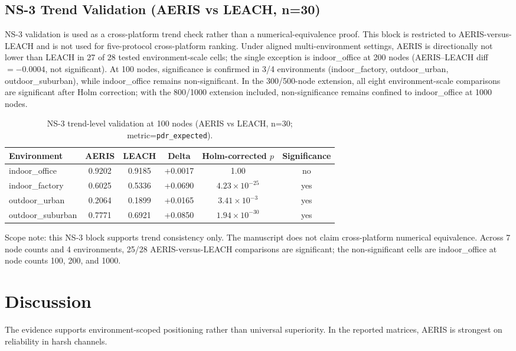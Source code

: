 \documentclass[sensors,article,submit,moreauthors,pdftex]{Definitions/mdpi}
\begin{document}
\subsection{NS-3 Trend Validation (AERIS vs LEACH, n=30)}
NS-3 validation is used as a cross-platform trend check rather than a numerical-equivalence proof. This block is restricted to AERIS-versus-LEACH and is not used for five-protocol cross-platform ranking. Under aligned multi-environment settings, AERIS is directionally not lower than LEACH in 27 of 28 tested environment-scale cells; the single exception is indoor\_office at 200 nodes (AERIS--LEACH diff $=-0.0004$, not significant). At 100 nodes, significance is confirmed in 3/4 environments (indoor\_factory, outdoor\_urban, outdoor\_suburban), while indoor\_office remains non-significant. In the 300/500-node extension, all eight environment-scale comparisons are significant after Holm correction; with the 800/1000 extension included, non-significance remains confined to indoor\_office at 1000 nodes.

\begin{table}[H]
\caption{NS-3 trend-level validation at 100 nodes (AERIS vs LEACH, n=30; metric=\texttt{pdr\_expected}).}
\label{tab:ns3_trend}
\centering
\begin{tabular}{lccccc}
\toprule
Environment & AERIS & LEACH & Delta & Holm-corrected $p$ & Significance \\
\midrule
indoor\_office    & 0.9202 & 0.9185 & +0.0017 & 1.00 & no \\
indoor\_factory   & 0.6025 & 0.5336 & +0.0690 & $4.23\times10^{-25}$ & yes \\
outdoor\_urban    & 0.2064 & 0.1899 & +0.0165 & $3.41\times10^{-3}$ & yes \\
outdoor\_suburban & 0.7771 & 0.6921 & +0.0850 & $1.94\times10^{-30}$ & yes \\
\bottomrule
\end{tabular}
\end{table}

Scope note: this NS-3 block supports trend consistency only. The manuscript does not claim cross-platform numerical equivalence. Across 7 node counts and 4 environments, 25/28 AERIS-versus-LEACH comparisons are significant; the non-significant cells are indoor\_office at node counts 100, 200, and 1000.

\section{Discussion}
The evidence supports environment-scoped positioning rather than universal superiority. In the reported matrices, AERIS is strongest on reliability in harsh channels.
\end{document}
